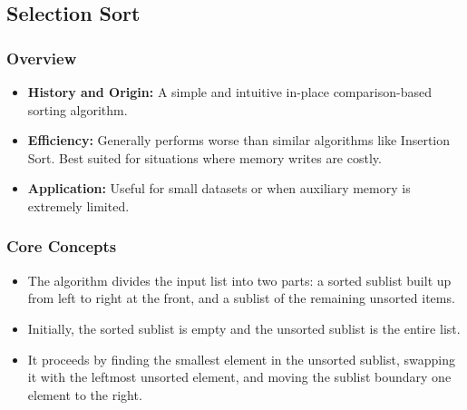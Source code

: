 \subsection[Selection Sort]{Selection Sort \cite{alnihoud2010enhancement}}
    \subsubsection{Overview}
        \begin{itemize}
            \item \textbf{History and Origin:} A simple and intuitive in-place comparison-based sorting algorithm.
            \item \textbf{Efficiency:} Generally performs worse than similar algorithms like Insertion Sort. Best suited for situations where memory writes are costly.
            \item \textbf{Application:} Useful for small datasets or when auxiliary memory is extremely limited.
        \end{itemize}
    \subsubsection{Core Concepts}
        \begin{itemize}
            \item The algorithm divides the input list into two parts: a sorted sublist built up from left to right at the front, and a sublist of the remaining unsorted items.
            \item Initially, the sorted sublist is empty and the unsorted sublist is the entire list.
            \item It proceeds by finding the smallest element in the unsorted sublist, swapping it with the leftmost unsorted element, and moving the sublist boundary one element to the right.
        \end{itemize}

